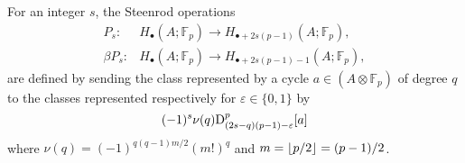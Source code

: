 \sssec

For an integer $s$, the Steenrod operations
\begin{align*}
	P_s \colon& H_\bullet(A; \mathbb{F}_p) \to H_{\bullet + 2s(p-1)}(A; \mathbb{F}_p), \\
	\beta P_s \colon& H_\bullet(A; \mathbb{F}_p) \to H_{\bullet + 2s(p-1) - 1}(A; \mathbb{F}_p),
\end{align*}
are defined by sending the class represented by a cycle $a \in (A \otimes \mathbb{F}_p)$ of degree $q$ to the classes represented respectively for $\varepsilon \in\{0,1\}$ by
\begin{equation*}
	(-1)^s \nu(q) \mathrm{D}^p_{(2s-q)(p-1)-\varepsilon}[a]
\end{equation*}
where $\nu(q) = (-1)^{q(q-1)m/2}(m!)^q$ and $m = \lfloor p/2\rfloor = (p-1)/2$.

%
